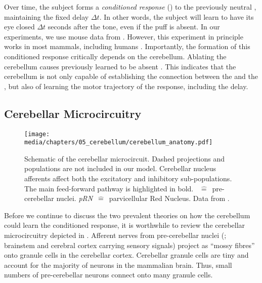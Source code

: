 Over time, the subject forms a \emph{conditioned response} (\CR) to the previously neutral \CS, maintaining the fixed delay $\Delta t$. In other words, the subject will learn to have its eye closed $\Delta t$ seconds after the tone, even if the puff is absent.
In our experiments, we use mouse data from \citet{heiney2014cerebellardependent}.
However, this experiment in principle works in most mammals, including humans \citep{cheng2008neural}.
Importantly, the formation of this conditioned response critically depends on the cerebellum.
Ablating the cerebellum causes previously learned \CRpl to be absent \citep{mccormick1981engram}.
This indicates that the cerebellum is not only capable of establishing the connection between the \CS and the \UR, but also of learning the motor trajectory of the response, including the delay.

\subsection{Cerebellar Microcircuitry}
\label{sec:cerebellum_microcircuit}

\begin{figure}[t]
	\centering
	\texttt{[image: media/chapters/05\_cerebellum/cerebellum\_anatomy.pdf]}
	\caption[Schematic of the cerebellar microcircuit]{Schematic of the cerebellar microcircuit. Dashed projections and populations are not included in our model. Cerebellar nucleus afferents affect both the excitatory and inhibitory sub-populations.  The main feed-forward pathway is highlighted in bold. \emph{\PCN}~$\hat=$~pre-cerebellar nuclei. \emph{pRN}~$\hat=$~parvicellular Red Nucleus. Data from \citet{ito2010cerebellar,llinas2010olivocerebellar}.}
	\vspace*{-0.5em}
	\label{fig:cerebellum_anatomy}
\end{figure}

Before we continue to discuss the two prevalent theories on how the cerebellum could learn the conditioned response, it is worthwhile to review the cerebellar microcircuitry depicted in .
Afferent nerves from pre-cerebellar nuclei (\PCN; brainstem and cerebral cortex carrying sensory signals) project as \enquote{mossy fibres} onto granule cells in the cerebellar cortex.
Cerebellar granule cells are tiny and account for the majority of neurons in the mammalian brain.
Thus, small numbers of pre-cerebellar neurons connect onto many granule cells.

